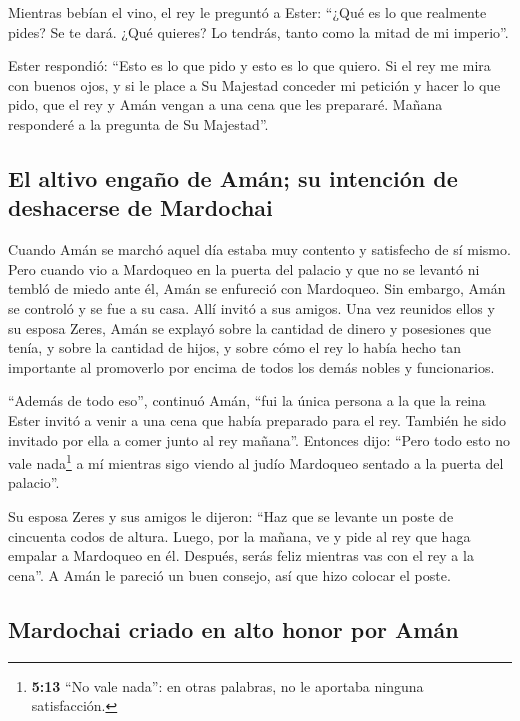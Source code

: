  Mientras bebían el vino, el rey le preguntó a Ester:
``¿Qué es lo que realmente pides? Se te dará. ¿Qué quieres? Lo tendrás,
tanto como la mitad de mi imperio''.

 Ester respondió: ``Esto es lo que pido y esto es lo que
quiero.  Si el rey me mira con buenos ojos, y si le place
a Su Majestad conceder mi petición y hacer lo que pido, que el rey y
Amán vengan a una cena que les prepararé. Mañana responderé a la
pregunta de Su Majestad''.

\hypertarget{el-altivo-engauxf1o-de-amuxe1n-su-intenciuxf3n-de-deshacerse-de-mardochai}{%
\subsection{El altivo engaño de Amán; su intención de deshacerse de
Mardochai}\label{el-altivo-engauxf1o-de-amuxe1n-su-intenciuxf3n-de-deshacerse-de-mardochai}}

 Cuando Amán se marchó aquel día estaba muy contento y
satisfecho de sí mismo. Pero cuando vio a Mardoqueo en la puerta del
palacio y que no se levantó ni tembló de miedo ante él, Amán se
enfureció con Mardoqueo.  Sin embargo, Amán se controló y
se fue a su casa. Allí invitó a sus amigos. Una vez reunidos ellos y su
esposa Zeres,  Amán se explayó sobre la cantidad de
dinero y posesiones que tenía, y sobre la cantidad de hijos, y sobre
cómo el rey lo había hecho tan importante al promoverlo por encima de
todos los demás nobles y funcionarios.

 ``Además de todo eso'', continuó Amán, ``fui la única
persona a la que la reina Ester invitó a venir a una cena que había
preparado para el rey. También he sido invitado por ella a comer junto
al rey mañana''.  Entonces dijo: ``Pero todo esto no vale
nada\footnote{\textbf{5:13} ``No vale nada'': en otras palabras, no le
  aportaba ninguna satisfacción.} a mí mientras sigo viendo al judío
Mardoqueo sentado a la puerta del palacio''.

 Su esposa Zeres y sus amigos le dijeron: ``Haz que se
levante un poste de cincuenta codos de altura. Luego, por la mañana, ve
y pide al rey que haga empalar a Mardoqueo en él. Después, serás feliz
mientras vas con el rey a la cena''. A Amán le pareció un buen consejo,
así que hizo colocar el poste.

\hypertarget{mardochai-criado-en-alto-honor-por-amuxe1n}{%
\subsection{Mardochai criado en alto honor por
Amán}\label{mardochai-criado-en-alto-honor-por-amuxe1n}}

